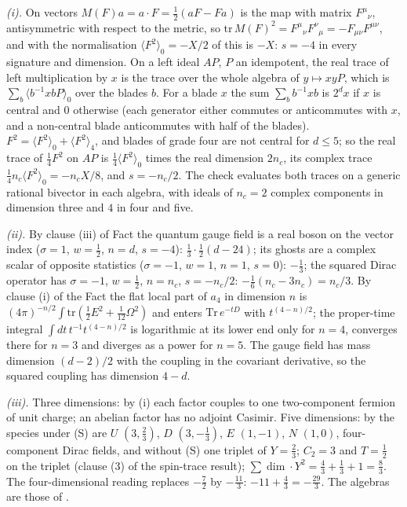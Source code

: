 \emph{(i).} On vectors $M(F)a = a\cdot F = \tfrac12(aF - Fa)$ is the map with matrix $F^{\mu}{}_{\nu}$, antisymmetric with respect to the metric, so $\mathrm{tr}\,M(F)^{2} = F^{\mu}{}_{\nu}F^{\nu}{}_{\mu} = -F_{\mu\nu}F^{\mu\nu}$, and with the normalisation $\langle F^{2}\rangle_{0} = -X/2$ of  this is $-X$: $s = -4$ in every signature and dimension. On a left ideal $AP$, $P$ an idempotent, the real trace of left multiplication by $x$ is the trace over the whole algebra of $y \mapsto xyP$, which is $\sum_{b}\langle b^{-1}xbP\rangle_{0}$ over the blades $b$. For a blade $x$ the sum $\sum_{b}b^{-1}xb$ is $2^{d}x$ if $x$ is central and $0$ otherwise (each generator either commutes or anticommutes with $x$, and a non-central blade anticommutes with half of the blades). $F^{2} = \langle F^{2}\rangle_{0} + \langle F^{2}\rangle_{4}$, and blades of grade four are not central for $d \le 5$; so the real trace of $\tfrac14F^{2}$ on $AP$ is $\tfrac14\langle F^{2}\rangle_{0}$ times the real dimension $2n_{c}$, its complex trace $\tfrac14 n_{c}\langle F^{2}\rangle_{0} = -n_{c}X/8$, and $s = -n_{c}/2$. The check evaluates both traces on a generic rational bivector in each algebra, with ideals of $n_{c} = 2$ complex components in dimension three and $4$ in four and five.

\emph{(ii).} By clause (iii) of Fact  the quantum gauge field is a real boson on the vector index ($\sigma = 1$, $w = \tfrac12$, $n = d$, $s = -4$): $\tfrac13\cdot\tfrac12(d - 24)$; its ghosts are a complex scalar of opposite statistics ($\sigma = -1$, $w = 1$, $n = 1$, $s = 0$): $-\tfrac13$; the squared Dirac operator has $\sigma = -1$, $w = \tfrac12$, $n = n_{c}$, $s = -n_{c}/2$: $-\tfrac16(n_{c} - 3n_{c}) = n_{c}/3$. By clause (i) of the Fact the flat local part of $a_{4}$ in dimension $n$ is $(4\pi)^{-n/2}\int\mathrm{tr}(\tfrac12E^{2} + \tfrac1{12}\Omega^{2})$ and enters $\mathrm{Tr}\,e^{-tD}$ with $t^{(4-n)/2}$; the proper-time integral $\int dt\,t^{-1}t^{(4-n)/2}$ is logarithmic at its lower end only for $n = 4$, converges there for $n = 3$ and diverges as a power for $n = 5$. The gauge field has mass dimension $(d - 2)/2$ with the coupling in the covariant derivative, so the squared coupling has dimension $4 - d$.

\emph{(iii).} Three dimensions: by (i) each factor couples to one two-component fermion of unit charge; an abelian factor has no adjoint Casimir. Five dimensions: by  the species under (S) are $U$ $(3, \tfrac23)$, $D$ $(3, -\tfrac13)$, $E$ $(1, -1)$, $N$ $(1, 0)$, four-component Dirac fields, and without (S) one triplet of $Y = \tfrac23$; $C_{2} = 3$ and $T = \tfrac12$ on the triplet (clause (3) of the spin-trace result); $\sum\dim\cdot Y^{2} = \tfrac43 + \tfrac13 + 1 = \tfrac83$. The four-dimensional reading replaces $-\tfrac72$ by $-\tfrac{11}{3}$: $-11 + \tfrac43 = -\tfrac{29}{3}$. The algebras are those of .

